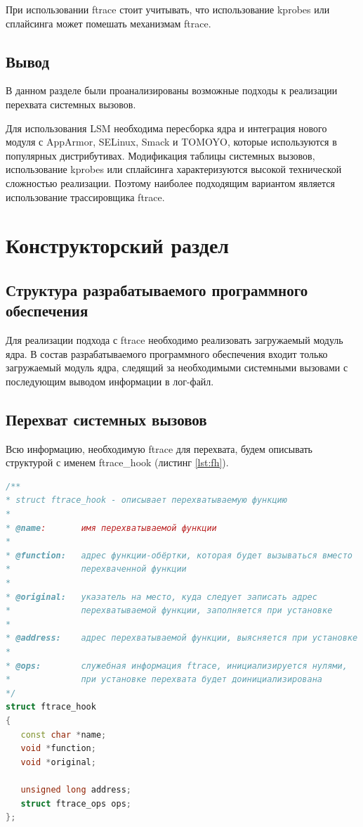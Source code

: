 \documentclass[a4paper,14pt]{article}
\begin{document}
При использовании ftrace стоит учитывать, что использование kprobes или сплайсинга может помешать меха­низмам ftrace.

\subsection{Вывод}

В данном разделе были проанализированы возможные подходы к реализации перехвата системных вызовов.

Для использования LSM необходима пересборка ядра и интеграция нового модуля с AppArmor, SELinux, Smack и TOMOYO, которые используются в популярных дистрибутивах. Модификация таблицы системных вызовов, использование kprobes или сплайсинга характеризуются высокой технической сложностью реализации. Поэтому наиболее подходящим вариантом является использование трассировщика ftrace.

\newpage
\section{Конструкторский раздел}

\subsection{Структура разрабатываемого программного обеспечения}

Для реализации подхода с ftrace необходимо реализовать загружаемый модуль ядра. В состав разрабатываемого программного обеспечения входит только загружаемый модуль ядра, следящий за необходимыми системными вызовами с последующим выводом информации в лог-файл.

\subsection{Перехват системных вызовов}

Всю информацию, необходимую ftrace для перехвата, будем описывать структурой с именем ftrace\_hook  (листинг \ref{lst:fh}).


\begin{lstlisting}[language=C++,label={lst:fh}, caption=\text{Описание перехватываемой функции.}]
/**
* struct ftrace_hook - описывает перехватываемую функцию
*
* @name:       имя перехватываемой функции
*
* @function:   адрес функции-обёртки, которая будет вызываться вместо
*              перехваченной функции
*
* @original:   указатель на место, куда следует записать адрес
*              перехватываемой функции, заполняется при установке
*
* @address:    адрес перехватываемой функции, выясняется при установке
*
* @ops:        служебная информация ftrace, инициализируется нулями,
*              при установке перехвата будет доинициализирована
*/
struct ftrace_hook
{
   const char *name;
   void *function;
   void *original;
   
   unsigned long address;
   struct ftrace_ops ops;
};   
\end{lstlisting}
\end{document}
